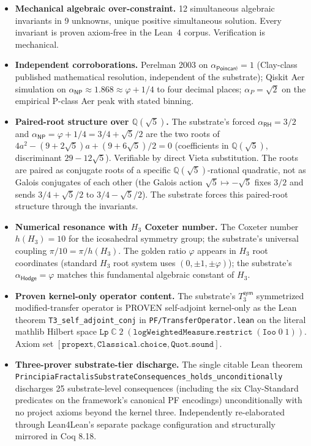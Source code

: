 \documentclass[11pt,a4paper]{amsart}
\theoremstyle{plain}
\theoremstyle{definition}
\begin{document}
\begin{itemize}[itemsep=2pt,leftmargin=2em]
\item \textbf{Mechanical algebraic over-constraint.} 12 simultaneous algebraic invariants in 9 unknowns, unique positive simultaneous solution. Every invariant is proven axiom-free in the Lean~4 corpus. Verification is mechanical.
\item \textbf{Independent corroborations.} Perelman 2003 on $\alpha_{\textsf{Poincar\'e}} = 1$ (Clay-class published mathematical resolution, independent of the substrate); Qiskit Aer simulation on $\alpha_{\textsf{NP}} \approx 1.868 \approx \varphi + 1/4$ to four decimal places; $\alpha_{P} = \sqrt{2}$ on the empirical P-class Aer peak with stated binning.
\item \textbf{Paired-root structure over $\mathbb{Q}(\sqrt{5})$.} The substrate's forced $\alpha_{\textsf{RH}} = 3/2$ and $\alpha_{\textsf{NP}} = \varphi + 1/4 = 3/4 + \sqrt{5}/2$ are the two roots of $4a^2 - (9+2\sqrt{5})a + (9+6\sqrt{5})/2 = 0$ (coefficients in $\mathbb{Q}(\sqrt{5})$, discriminant $29 - 12\sqrt{5}$). Verifiable by direct Vieta substitution. The roots are paired as conjugate roots of a specific $\mathbb{Q}(\sqrt{5})$-rational quadratic, not as Galois conjugates of each other (the Galois action $\sqrt{5} \mapsto -\sqrt{5}$ fixes $3/2$ and sends $3/4 + \sqrt{5}/2$ to $3/4 - \sqrt{5}/2$). The substrate forces this paired-root structure through the invariants.
\item \textbf{Numerical resonance with $H_3$ Coxeter number.} The Coxeter number $h(H_3) = 10$ for the icosahedral symmetry group; the substrate's universal coupling $\pi/10 = \pi/h(H_3)$. The golden ratio $\varphi$ appears in $H_3$ root coordinates (standard $H_3$ root system uses $(0, \pm 1, \pm \varphi)$); the substrate's $\alpha_{\textsf{Hodge}} = \varphi$ matches this fundamental algebraic constant of $H_3$.
\item \textbf{Proven kernel-only operator content.} The substrate's $T_3^{\textsf{sym}}$ symmetrized modified-transfer operator is PROVEN self-adjoint kernel-only as the Lean theorem
\texttt{T3\_self\_adjoint\_conj} in \texttt{PF/TransferOperator.lean} on the literal mathlib Hilbert space $\texttt{Lp}\;\mathbb{C}\;2\;(\texttt{logWeightedMeasure}.\texttt{restrict}\;(\texttt{Ioo}\;0\;1))$. Axiom set $[\texttt{propext}, \texttt{Classical.choice}, \texttt{Quot.sound}]$.
\item \textbf{Three-prover substrate-tier discharge.} The single citable Lean theorem \texttt{PrincipiaFractalisSubstrateConsequences\_holds\_unconditionally} discharges 25 substrate-level consequences (including the six Clay-Standard predicates on the framework's canonical PF encodings) unconditionally with no project axioms beyond the kernel three. Independently re-elaborated through Lean4Lean's separate package configuration and structurally mirrored in Coq 8.18.

\end{itemize}
\end{document}
